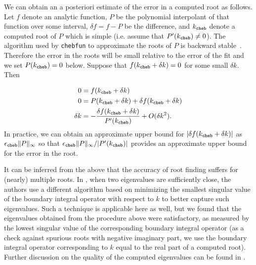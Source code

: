 We can obtain an a posteriori estimate of the
error in a computed root as follows.
%
Let $f$ denote an analytic function,
$P$ be the polynomial interpolant
of that function over some interval,
$\delta f = f-P$ be the difference,
and $k_{\texttt{cheb}}$ denote a computed root
of $P$ which is simple (i.e. assume
that $P'(k_{\texttt{cheb}}) \ne 0$).
%
The algorithm used by \texttt{chebfun}
to approximate the roots of $P$ is
backward stable~\cite{noferini2017chebyshev}.
Therefore the error in the roots will be
small relative to the error of the fit and
we set $P(k_{\texttt{cheb}}) = 0$ below.
%
Suppose that
$f(k_{\texttt{cheb}} + \delta k) = 0$ for some
small $\delta k$. Then

\begin{align*}
  0 &= f(k_{\texttt{cheb}} + \delta k) \\
  0 &= P(k_{\texttt{cheb}} + \delta k) + \delta f(k_{\texttt{cheb}} + \delta k) \\
  \delta k &= -\frac{\delta f(k_{\texttt{cheb}} + \delta k)}{P'(k_{\texttt{cheb}})} + O(\delta k^2) .
\end{align*}
In practice, we can obtain an approximate upper
bound for $|\delta f(k_{\texttt{cheb}}+\delta k)|$
as ${\epsilon_{\texttt{cheb}}} \|P\|_\infty$ so that ${\epsilon_{\texttt{cheb}}} \|P\|_\infty/
|P'(k_{\texttt{cheb}})|$ provides an approximate upper bound
for the error in the root.

{\color{red} It can be inferred from the above
  that the accuracy
  of root finding suffers for (nearly) multiple roots.
  In \cite{zhao2015robust}, when two eigenvalues
  are sufficiently close, the authors use a different
  algorithm based on minimizing
  the smallest singular value of the boundary integral
  operator with respect to $k$
  to better capture such eigenvalues.
  Such a technique is applicable here as well,
  but we found that the eigenvalues
  obtained from the procedure above were
  satisfactory, as measured by the lowest
  singular value of the corresponding
  boundary integral operator (as a check against
  spurious roots with negative imaginary part,
  we use the boundary integral operator corresponding
  to $k$ equal to the real part of a computed root). Further
  discussion on the quality of the computed eigenvalues can be
  found in \cite{zhao2015robust}. }

